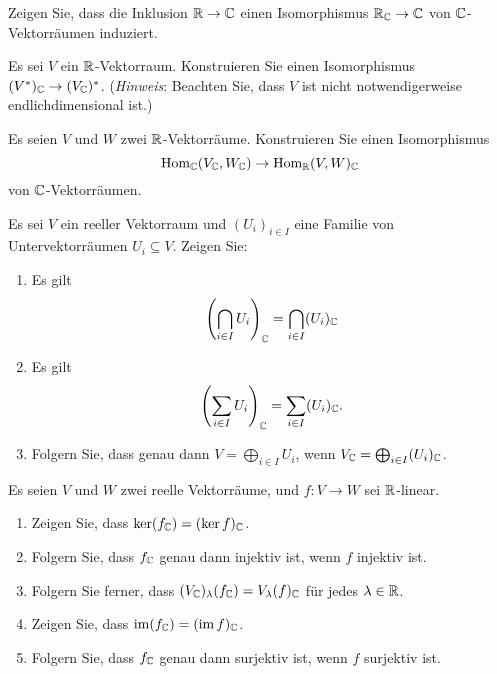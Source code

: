 \documentclass[a4paper,10pt]{scrartcl}
\begin{document}


\begin{question}
  Zeigen Sie, dass die Inklusion $\mathbb{R} \to \mathbb{C}$ einen Isomorphismus $\mathbb{R}_{\mathbb{C}} \to \mathbb{C}$ von $\mathbb{C}$-Vektorräumen induziert.
\end{question}


\begin{question}
  Es sei $V$ ein $\mathbb{R}$-Vektorraum.
  Konstruieren Sie einen Isomorphismus $(V^*)_{\mathbb{C}} \to (V_{\mathbb{C}})^*$.
  (\emph{Hinweis}: Beachten Sie, dass $V$ ist nicht notwendigerweise endlichdimensional ist.)
\end{question}


\begin{question}
  Es seien $V$ und $W$ zwei $\mathbb{R}$-Vektorräume.
  Konstruieren Sie einen Isomorphismus
  \[
    \operatorname{Hom}_{\mathbb{C}}(V_{\mathbb{C}}, W_{\mathbb{C}}) \to \operatorname{Hom}_{\mathbb{R}}(V, W)_{\mathbb{C}}
  \]
  von $\mathbb{C}$-Vektorräumen.
\end{question}


\begin{question}
  Es sei $V$ ein reeller Vektorraum und $(U_i)_{i \in I}$ eine Familie von Untervektorräumen $U_i \subseteq V$.
  Zeigen Sie:
  \begin{enumerate}[leftmargin=*]
    \item
      Es gilt
      \[
          \left( \bigcap_{i \in I} U_i \right)_{\mathbb{C}}
        = \bigcap_{i \in I} (U_i)_{\mathbb{C}}
      \]
    \item
      Es gilt
      \[
          \left( \sum_{i \in I} U_i \right)_{\mathbb{C}}
        = \sum_{i \in I} (U_i)_{\mathbb{C}}.
      \]
    \item
      Folgern Sie, dass genau dann $V = \bigoplus_{i \in I} U_i$, wenn $V_{\mathbb{C}} = \bigoplus_{i \in I} (U_i)_{\mathbb{C}}$.
  \end{enumerate}
\end{question}


\begin{question}
  Es seien $V$ und $W$ zwei reelle Vektorräume, und $f \colon V \to W$ sei $\mathbb{R}$-linear.
  \begin{enumerate}[leftmargin=*]
    \item
      Zeigen Sie, dass $\ker (f_{\mathbb{C}}) = (\ker f)_{\mathbb{C}}$.
    \item
      Folgern Sie, dass $f_{\mathbb{C}}$ genau dann injektiv ist, wenn $f$ injektiv ist.
    \item
      Folgern Sie ferner, dass $(V_{\mathbb{C}})_\lambda(f_{\mathbb{C}}) = V_\lambda(f)_{\mathbb{C}}$ für jedes $\lambda \in \mathbb{R}$.
    \item
      Zeigen Sie, dass $\operatorname{im} (f_{\mathbb{C}}) = (\operatorname{im} f)_{\mathbb{C}}$.
    \item
      Folgern Sie, dass $f_{\mathbb{C}}$ genau dann surjektiv ist, wenn $f$ surjektiv ist.
  \end{enumerate}
\end{question}
\end{document}
